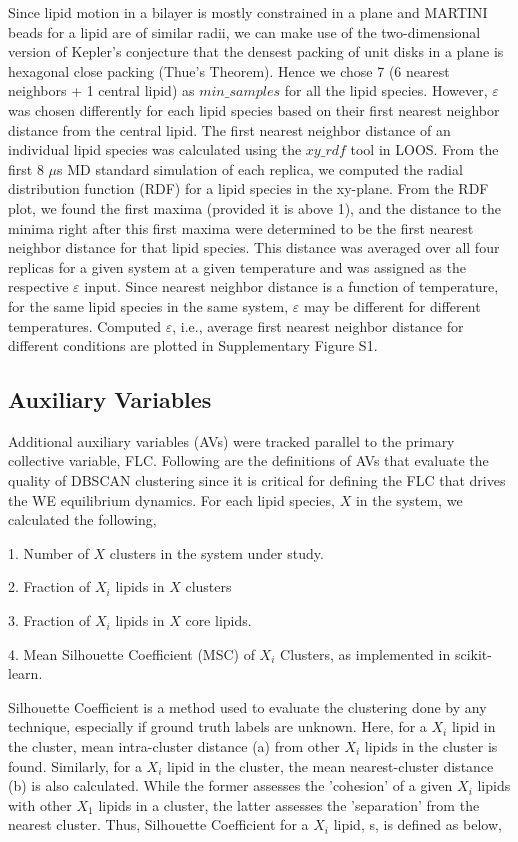 \documentclass{biophys-new}
\begin{document}
Since lipid motion in a bilayer is mostly constrained in a plane and MARTINI beads for a lipid are of similar radii, we can make use of the two-dimensional
version of Kepler's conjecture that the densest packing of unit disks in a plane is hexagonal close packing (Thue's Theorem).
Hence we chose 7 (6 nearest neighbors + 1 central lipid) as $min\_samples$ for all the lipid species.
However, $\varepsilon$ was chosen differently for each lipid species based on their first nearest neighbor distance from the central lipid.
The first nearest neighbor distance of an individual lipid species was calculated using the $xy\_rdf$ tool in LOOS.
From the first 8 $\mu$s MD standard simulation of each replica, we computed the radial distribution function (RDF) for a lipid species in the xy-plane. 
From the RDF plot, we found the first maxima (provided it is above 1), and the distance to the minima right after this first maxima were determined to be the first nearest neighbor distance for that lipid species.
This distance was averaged over all four replicas for a given system at a given temperature and was assigned as the respective $\varepsilon$ input.
Since nearest neighbor distance is a function of temperature, for the same lipid species in the same system, $\varepsilon$ may be different for different temperatures.
Computed $\varepsilon$, i.e., average first nearest neighbor distance for different conditions are plotted in Supplementary Figure S1.

\subsection*{Auxiliary Variables}

Additional auxiliary variables (AVs) were tracked parallel to the primary collective variable, FLC. 
Following are the definitions of AVs that evaluate the quality of DBSCAN clustering since it is critical for defining the FLC that drives the WE equilibrium dynamics. 
For each lipid species, $X$ in the system, we calculated the following, 

1. Number of $X$ clusters in the system under study.

2. Fraction of $X_i$ lipids in $X$ clusters

3. Fraction of $X_i$ lipids in $X$ core lipids.

4. Mean Silhouette Coefficient (MSC) of $X_i$ Clusters, as implemented in scikit-learn.

Silhouette Coefficient is a method used to evaluate the clustering done by any technique, especially if ground truth labels are unknown. 
Here, for a $X_i$ lipid in the cluster, mean intra-cluster distance (a) from other $X_i$ lipids in the cluster is found.  
Similarly, for a $X_i$ lipid in the cluster, the mean nearest-cluster distance (b) is also calculated.
While the former assesses the 'cohesion' of a given $X_i$ lipids with other $X_1$ lipids in a cluster, the latter assesses the 'separation' from the nearest cluster.
Thus, Silhouette Coefficient for a $X_i$ lipid, s, is defined as below,
\end{document}
